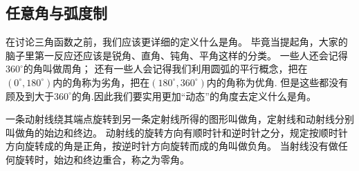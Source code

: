 \subsection{任意角与弧度制}
在讨论三角函数之前，我们应该更详细的定义什么是角。
毕竟当提起角，大家的脑子里第一反应还应该是锐角、直角、钝角、平角这样的分类。
一些人还会记得$360^\circ $的角叫做周角；
还有一些人会记得我们利用圆弧的平行概念，把在$(0^\circ,180^\circ)$内的角称为劣角，把在$(180^\circ,360^\circ)$内的角称为优角.
但是这些都没有顾及到大于$360^\circ$的角.因此我们要实用更加“动态”的角度去定义什么是角。
\begin{definition}[任意角]
    一条动射线绕其端点旋转到另一条定射线所得的图形叫做角，定射线和动射线分别叫做角的始边和终边。
    动射线的旋转方向有顺时针和逆时针之分，规定按顺时针方向旋转成的角是正角，按逆时针方向旋转而成的角叫做负角。
    当射线没有做任何旋转时，始边和终边重合，称之为零角。
\end{definition}

